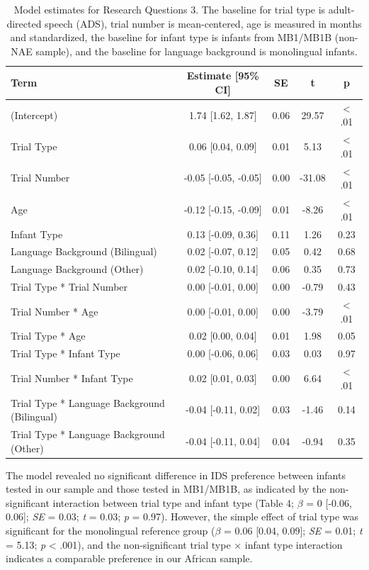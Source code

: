 \documentclass[
  english,
  ,man,floatsintext]{apa6}
\begin{document}
\begin{table}

\caption{Model estimates for Research Questions 3. The baseline for trial type is adult-directed speech (ADS), trial number is mean-centered, age is measured in months and standardized, the baseline for infant type is infants from MB1/MB1B (non-NAE sample), and the baseline for language background is monolingual infants.}
\centering
\begin{tabular}[t]{lcccc}
\toprule
Term & Estimate [95\% CI] & SE & t & p\\
\midrule
(Intercept) & 1.74 [1.62, 1.87] & 0.06 & 29.57 & < .01\\
Trial Type & 0.06 [0.04, 0.09] & 0.01 & 5.13 & < .01\\
Trial Number & -0.05 [-0.05, -0.05] & 0.00 & -31.08 & < .01\\
Age & -0.12 [-0.15, -0.09] & 0.01 & -8.26 & < .01\\
Infant Type & 0.13 [-0.09, 0.36] & 0.11 & 1.26 & 0.23\\
\addlinespace
Language Background (Bilingual) & 0.02 [-0.07, 0.12] & 0.05 & 0.42 & 0.68\\
Language Background (Other) & 0.02 [-0.10, 0.14] & 0.06 & 0.35 & 0.73\\
Trial Type * Trial Number & 0.00 [-0.01, 0.00] & 0.00 & -0.79 & 0.43\\
Trial Number * Age & 0.00 [-0.01, 0.00] & 0.00 & -3.79 & < .01\\
Trial Type * Age & 0.02 [0.00, 0.04] & 0.01 & 1.98 & 0.05\\
\addlinespace
Trial Type * Infant Type & 0.00 [-0.06, 0.06] & 0.03 & 0.03 & 0.97\\
Trial Number * Infant Type & 0.02 [0.01, 0.03] & 0.00 & 6.64 & < .01\\
Trial Type * Language Background (Bilingual) & -0.04 [-0.11, 0.02] & 0.03 & -1.46 & 0.14\\
Trial Type * Language Background (Other) & -0.04 [-0.11, 0.04] & 0.04 & -0.94 & 0.35\\
\bottomrule
\end{tabular}
\end{table}

The model revealed no significant difference in IDS preference between infants tested in our sample and those tested in MB1/MB1B, as indicated by the non-significant interaction between trial type and infant type (Table 4; \emph{\(\beta\)} = 0 {[}-0.06, 0.06{]}; \emph{SE} = 0.03; \emph{t} = 0.03; \emph{p} = 0.97). However, the simple effect of trial type was significant for the monolingual reference group (\emph{\(\beta\)} = 0.06 {[}0.04, 0.09{]}; \emph{SE} = 0.01; \emph{t} = 5.13; \emph{p} \textless{} .001), and the non-significant trial type × infant type interaction indicates a comparable preference in our African sample.
\end{document}
